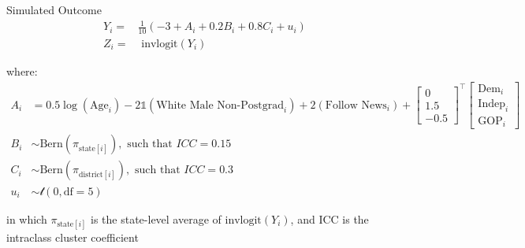 \documentclass[ignorenonframetext, 10pt, aspectratio=169]{beamer}
\begin{document}
\begin{frame}
{Simulated Outcome}
\begin{align*}
Y_i =& \frac{1}{10}(-3 + A_i + 0.2 B_i + 0.8 C_i + u_i)\\
Z_i =& \text{ invlogit}(Y_i)
\end{align*}

where:
\begin{align*}
A_i &= 0.5\log(\text{Age}_i) -2\mathds{1}(\text{White Male Non-Postgrad}_i) + 2(\text{Follow News}_i) + \begin{bmatrix}0\\1.5\\-0.5\end{bmatrix}^\top\begin{bmatrix}\text{Dem}_{i}\\\text{Indep}_i\\\text{GOP}_i\end{bmatrix}\\
B_i &\sim \text{Bern}(\pi_{\text{state}[i]}), \text{ such that }  ICC = 0.15\\
C_i &\sim \text{Bern}(\pi_{\text{district}[i]}), \text{ such that }  ICC = 0.3\\
u_i &\sim \mathcal{t}(0, \text{df} = 5)
\end{align*}

\normalsize
in which \(\pi_{\text{state}[i]}\) is the state-level average of \(\text{invlogit}(Y_i)\), and ICC is the intraclass cluster coefficient


\end{frame}
\end{document}
